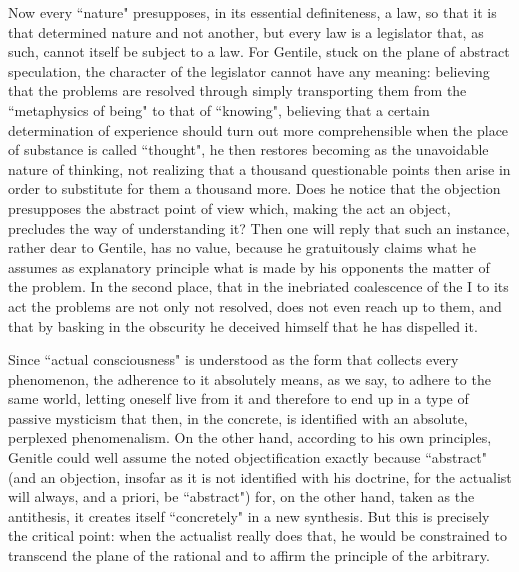 Now every ``nature" presupposes, in its essential definiteness, a law, so that it is that determined nature and not another, but every law is a legislator that, as such, cannot itself be subject to a law. For Gentile, stuck on the plane of abstract speculation, the character of the legislator cannot have any meaning: believing that the problems are resolved through simply transporting them from the ``metaphysics of being" to that of ``knowing", believing that a certain determination of experience should turn out more comprehensible when the place of substance is called ``thought", he then restores becoming as the unavoidable nature of thinking, not realizing that a thousand questionable points then arise in order to substitute for them a thousand more. Does he notice that the objection presupposes the abstract point of view which, making the act an object, precludes the way of understanding it? Then one will reply that such an instance, rather dear to Gentile, has no value, because he gratuitously claims what he assumes as explanatory principle what is made by his opponents the matter of the problem. In the second place, that in the inebriated coalescence of the I to its act the problems are not only not resolved, does not even reach up to them, and that by basking in the obscurity he deceived himself that he has dispelled it.

Since ``actual consciousness" is understood as the form that collects every phenomenon, the adherence to it absolutely means, as we say, to adhere to the same world, letting oneself live from it and therefore to end up in a type of passive mysticism that then, in the concrete, is identified with an absolute, perplexed phenomenalism. On the other hand, according to his own principles, Genitle could well assume the noted objectification exactly because ``abstract" (and an objection, insofar as it is not identified with his doctrine, for the actualist will always, and a priori, be ``abstract") for, on the other hand, taken as the antithesis, it creates itself ``concretely" in a new synthesis. But this is precisely the critical point: when the actualist really does that, he would be constrained to transcend the plane of the rational and to affirm the principle of the arbitrary.

